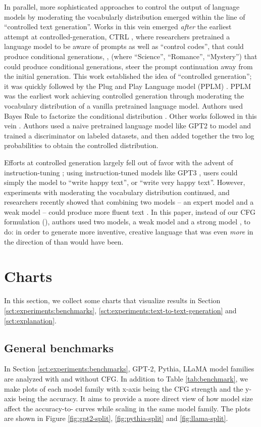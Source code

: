 \documentclass{article}
\begin{document}
In parallel, more sophisticated approaches to control the output of language models by moderating the vocabularly distribution emerged within the line of ``controlled text generation''. Works in this vein emerged \textit{after} the earliest attempt at controlled-generation, CTRL \cite{keskar2019ctrl}, where researchers pretrained a language model to be aware of prompts as well as ``control codes'',  that could produce conditional generations, , (where  ``Science'', ``Romance'', ``Mystery'') that could produce conditional generations, steer the prompt continuation away from the initial generation. This work established the idea of ``controlled generation''; it was quickly followed by the Plug and Play Language model (PPLM) \cite{dathathri2019plug}. PPLM was the earliest work achieving controlled generation through moderating the vocabulary distribution of a vanilla pretrained language model. Authors used Bayes Rule to factorize the conditional distribution . Other works followed in this vein \cite{krause2020gedi, yang2021fudge, spangher2023sequentially, meng2022controllable, li2022diffusion}. Authors used a naive pretrained language model like GPT2 \cite{radford2019language} to model  and trained a discriminator  on labeled datasets, and then added together the two log probabilities to obtain the controlled distribution.

Efforts at controlled generation largely fell out of favor with the advent of instruction-tuning \cite{ouyang2022training}; using instruction-tuned models like GPT3 \cite{brown2020language}, users could simply the model to ``write happy text'', or ``write very happy text''. However, experiments with moderating the vocabulary distribution continued, and researchers recently showed that combining two models -- an expert model and a weak model -- could produce more fluent text \cite{li2022contrastive}. In this paper, instead of our CFG formulation (), authors used two models, a weak model  and a strong model , to do:  in order to generate more inventive, creative language that was even \textit{more} in the direction of  than would have been.


\section{Charts}
In this section, we collect some charts that visualize results in Section \ref{sct:experiments:benchmarks}, \ref{sct:experiments:text-to-text-generation} and \ref{sct:explanation}.

\subsection{General benchmarks}\label{appendix:charts:general-benchmarks}
In Section \ref{sct:experiments:benchmarks}, GPT-2, Pythia, LLaMA model families are analyzed with and without CFG. In addition to Table \ref{tab:benchmark}, we make plots of each model family with x-axis being the CFG strength and the y-axis being the accuracy. It aims to provide a more direct view of how model size affect the accuracy-to- curves while scaling in the same model family. The plots are shown in Figure \ref{fig:gpt2-split}, \ref{fig:pythia-split} and \ref{fig:llama-split}.
\end{document}
